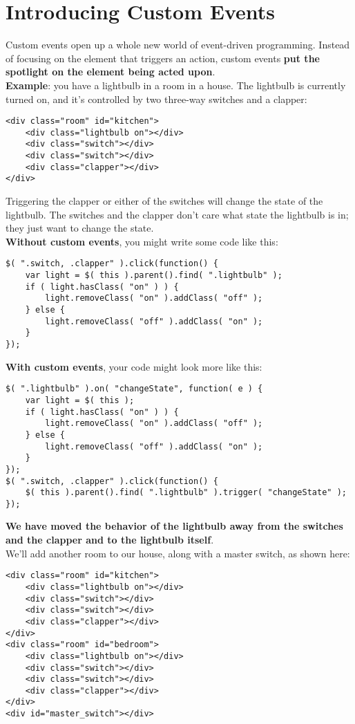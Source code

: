 \documentclass[10pt,letterpaper]{report}
\begin{document}
\section{Introducing Custom Events}
Custom events open up a whole new world of event-driven programming. Instead of focusing on the element that triggers an action, custom events \textbf{put the spotlight on the element being acted upon}.\\
\textbf{Example}: you have a lightbulb in a room in a house. The lightbulb is currently turned on, and it's controlled by two three-way switches and a clapper:
\lstset{language=HTML} 
\begin{lstlisting}
<div class="room" id="kitchen">
	<div class="lightbulb on"></div>
	<div class="switch"></div>
	<div class="switch"></div>
	<div class="clapper"></div>
</div>
\end{lstlisting}
Triggering the clapper or either of the switches will change the state of the lightbulb. The switches and the clapper don't care what state the lightbulb is in; they just want to change the state.\\ \textbf{Without custom events}, you might write some code like this:
\lstset{language=JavaScript} 
\begin{lstlisting}
$( ".switch, .clapper" ).click(function() {
	var light = $( this ).parent().find( ".lightbulb" );
	if ( light.hasClass( "on" ) ) {
		light.removeClass( "on" ).addClass( "off" );
	} else {
		light.removeClass( "off" ).addClass( "on" );
	}
});
\end{lstlisting}
\textbf{With custom events}, your code might look more like this:
\begin{lstlisting}
$( ".lightbulb" ).on( "changeState", function( e ) {
	var light = $( this );
	if ( light.hasClass( "on" ) ) {
		light.removeClass( "on" ).addClass( "off" );
	} else {
		light.removeClass( "off" ).addClass( "on" );
	}
});
$( ".switch, .clapper" ).click(function() {
	$( this ).parent().find( ".lightbulb" ).trigger( "changeState" );
});
\end{lstlisting}
\textbf{We have moved the behavior of the lightbulb away from the switches and the clapper and to the lightbulb itself}.\\
We'll add another room to our house, along with a master switch, as shown here:
\lstset{language=HTML} 
\begin{lstlisting}
<div class="room" id="kitchen">
	<div class="lightbulb on"></div>
	<div class="switch"></div>
	<div class="switch"></div>
	<div class="clapper"></div>
</div>
<div class="room" id="bedroom">
	<div class="lightbulb on"></div>
	<div class="switch"></div>
	<div class="switch"></div>
	<div class="clapper"></div>
</div>
<div id="master_switch"></div>
\end{lstlisting}
\end{document}
